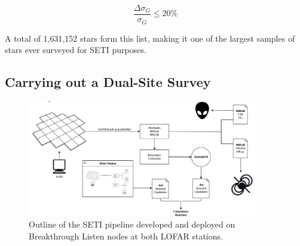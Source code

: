 \begin{equation}
    \frac{\Delta \sigma_G}{\sigma_G} \leq 20\%
    \label{Gaia:filter2}
\end{equation}

A total of 1,631,152 stars form this list, making it one of the largest samples of stars ever surveyed for SETI purposes.

\subsection{Carrying out a Dual-Site Survey}


\begin{figure}
    \centering
    \includegraphics[width = 0.9\textwidth]{figs/SETI-pipeline.png}
    \caption{Outline of the SETI pipeline developed and deployed on Breakthrough Listen nodes at both LOFAR stations.}
    \label{fig:SETI-pipeline}
\end{figure}

